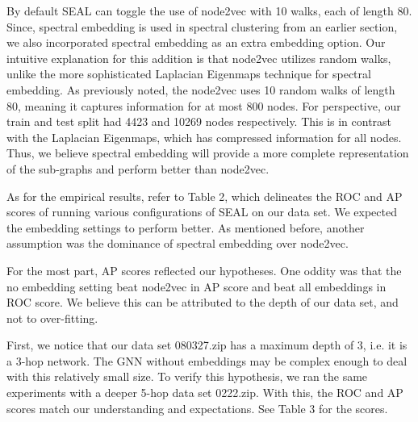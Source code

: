 \documentclass[10pt,twocolumn,letterpaper]{article}
\begin{document}
By default SEAL can toggle the use of node2vec with 10 walks, each of length 80. Since, spectral embedding is used in spectral clustering from an earlier section, we also incorporated spectral embedding as an extra embedding option. Our intuitive explanation for this addition is that node2vec utilizes random walks, unlike the more sophisticated Laplacian Eigenmaps technique for spectral embedding. As previously noted, the node2vec uses 10 random walks of length 80, meaning it captures information for at most 800 nodes. For perspective, our train and test split had 4423 and 10269 nodes respectively. This is in contrast with the Laplacian Eigenmaps, which has compressed information for all nodes. Thus, we believe spectral embedding will provide a more complete representation of the sub-graphs and perform better than node2vec.

As for the empirical results, refer to Table 2, which delineates the ROC and AP scores of running various configurations of SEAL on our data set. We expected the  embedding settings to perform better. As mentioned before, another assumption was the dominance of spectral embedding over node2vec. 

For the most part, AP scores reflected our hypotheses. One oddity was that the no embedding setting beat node2vec in AP score and beat all embeddings in ROC score. We believe this can be attributed to the depth of our data set, and not to over-fitting.

First, we notice that our data set 080327.zip has a maximum depth of 3, i.e. it is a 3-hop network. The GNN without embeddings may be complex enough to deal with this relatively small size. To verify this hypothesis, we ran the same experiments with a deeper 5-hop data set 0222.zip. With this, the ROC and AP scores match our understanding and expectations. See Table 3 for the scores.
\end{document}
